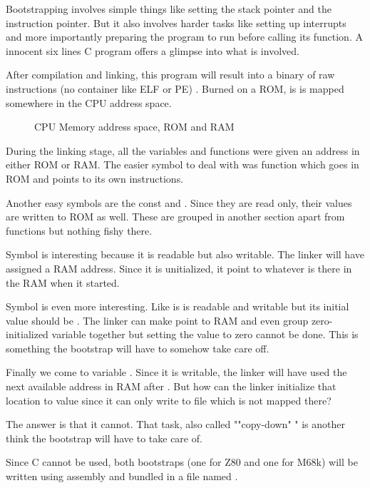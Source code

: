 Bootstrapping involves simple things like setting the stack pointer and the instruction pointer. But it also involves harder tasks like setting up interrupts and more importantly preparing the program to run before calling its  function. A innocent six lines C program offers a glimpse into what is involved.



After compilation and linking, this program will result into a binary of raw instructions (no container like ELF or PE) . Burned on a ROM, is is mapped somewhere in the CPU address space.

\begin{figure}[H]
\caption*{CPU Memory address space, ROM and RAM}
\end{figure}

During the linking stage, all the variables and functions were given an address in either ROM or RAM. The easier symbol to deal with was function  which goes in ROM and points to its own instructions.

Another easy symbols are the const  and . Since they are read only, their values are written to ROM as well. These are grouped in another section  apart from functions but nothing fishy there.

Symbol  is interesting because it is readable but also writable. The linker will have assigned a RAM address. Since it is unitialized, it point to whatever is there in the RAM when it started.

Symbol  is even more interesting. Like  is is readable and writable but its initial value should be . The linker can make  point to RAM and even group zero-initialized variable together but setting the value to zero cannot be done. This is something the bootstrap will have to somehow take care off.

Finally we come to variable . Since it is writable, the linker will have used the next available address in RAM after . But how can the linker initialize that location to value  since it can only write to file  which is not mapped there? 

The answer is that it cannot. That  task, also called ""copy-down" " is another think the bootstrap will have to take care of.

Since C cannot be used, both bootstraps (one for Z80 and one for M68k) will be written using assembly and bundled in a file named .





